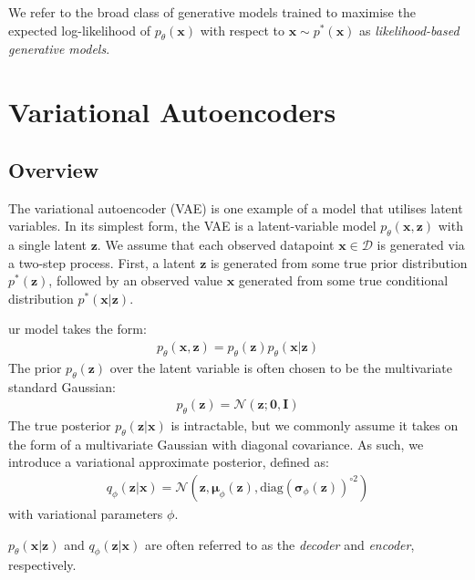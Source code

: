\documentclass[ oneside,%
                    author={George Herbert},
                    degree={MSci},
                     title={Video Diffusion Models for Climate Simulations},
                  subtitle={}]{dissertation}
\begin{document}
We refer to the broad class of generative models trained to maximise the expected log-likelihood of $p_\theta(\mathbf{x})$ with respect to $\mathbf{x}\sim p^*(\mathbf{x})$ as \textit{likelihood-based generative models}.

\section{Variational Autoencoders}
\label{sec:background_vae}

\subsection{Overview}
\label{sec:background_vae_latent}

The variational autoencoder (VAE) \cite{Autoencoding_Variational_Bayes_Kingma,Stochastic_Backpropagation_Rezende} is one example of a model that utilises latent variables. In its simplest form, the VAE is a latent-variable model $p_\theta(\mathbf{x},\mathbf{z})$ with a single latent $\mathbf{z}$. We assume that each observed datapoint $\mathbf{x}\in\mathcal{D}$ is generated via a two-step process. First, a latent $\mathbf{z}$ is generated from some true prior distribution $p^*(\mathbf{z})$, followed by an observed value $\mathbf{x}$ generated from some true conditional distribution $p^*(\mathbf{x}|\mathbf{z})$. 

ur model takes the form:
\begin{align}
      p_\theta(\mathbf{x},\mathbf{z})=p_\theta(\mathbf{z})p_\theta(\mathbf{x}|\mathbf{z})
\end{align}
The prior $p_\theta(\mathbf{z})$ over the latent variable is often chosen to be the multivariate standard Gaussian:
\begin{align}
      p_\theta(\mathbf{z})=\mathcal{N}(\mathbf{z};\mathbf{0}, \mathbf{I})
\end{align}
The true posterior $p_\theta(\mathbf{z}|\mathbf{x})$ is intractable, but we commonly assume it takes on the form of a multivariate Gaussian with diagonal covariance. As such, we introduce a variational approximate posterior, defined as:
\begin{align}
      q_\phi(\mathbf{z}|\mathbf{x})=\mathcal{N}(\mathbf{z}, \boldsymbol{\mu}_\phi(\mathbf{z}), \mathrm{diag}(\boldsymbol\sigma_\phi(\mathbf{z}))^{\circ 2})
\end{align}
with variational parameters $\phi$.

$p_\theta(\mathbf{x}|\mathbf{z})$ and $q_\phi(\mathbf{z}|\mathbf{x})$ are often referred to as the \textit{decoder} and \textit{encoder}, respectively.
\end{document}
